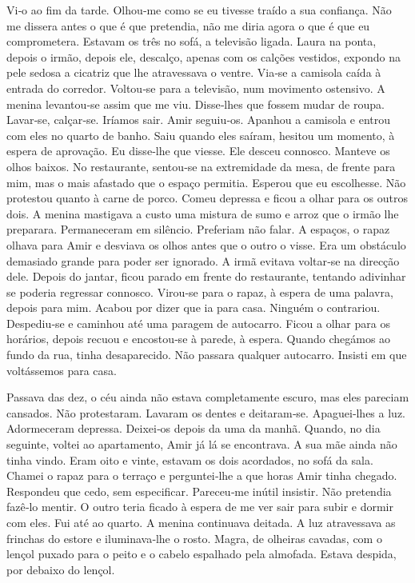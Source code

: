 Vi­‑o ao fim da tarde. Olhou­‑me como se eu tivesse traído a sua
confiança. Não me dissera antes o que é que pretendia, não me diria
agora o que é que eu comprometera. Estavam os três no sofá, a televisão
ligada. Laura na ponta, depois o irmão, depois ele, descalço, apenas com
os calções vestidos, expondo na pele sedosa a cicatriz que lhe
atravessava o ventre. Via­‑se a camisola caída à entrada do corredor.
Voltou­‑se para a televisão, num movimento ostensivo. A menina
levantou­‑se assim que me viu. Disse­‑lhes que fossem mudar de roupa.
Lavar­‑se, calçar­‑se. Iríamos sair. Amir seguiu­‑os. Apanhou a camisola
e entrou com eles no quarto de banho. Saiu quando eles saíram, hesitou
um momento, à espera de aprovação. Eu disse­‑lhe que viesse. Ele desceu
connosco. Manteve os olhos baixos. No restaurante, sentou­‑se na
extremidade da mesa, de frente para mim, mas o mais afastado que o
espaço permitia. Esperou que eu escolhesse. Não protestou quanto à carne
de porco. Comeu depressa e ficou a olhar para os outros dois. A menina
mastigava a custo uma mistura de sumo e arroz que o irmão lhe preparara.
Permaneceram em silêncio. Preferiam não falar. A espaços, o rapaz olhava
para Amir e desviava os olhos antes que o outro o visse. Era um
obstáculo demasiado grande para poder ser ignorado. A irmã evitava
voltar­‑se na direcção dele. Depois do jantar, ficou parado em frente do
restaurante, tentando adivinhar se poderia regressar connosco. Virou­‑se
para o rapaz, à espera de uma palavra, depois para mim. Acabou por dizer
que ia para casa. Ninguém o contrariou. Despediu­‑se e caminhou até uma
paragem de autocarro. Ficou a olhar para os horários, depois recuou e
encostou­‑se à parede, à espera. Quando chegámos ao fundo da rua, tinha
desaparecido. Não passara qualquer autocarro. Insisti em que voltássemos
para casa.

Passava das dez, o céu ainda não estava completamente escuro, mas eles
pareciam cansados. Não protestaram. Lavaram os dentes e deitaram­‑se.
Apaguei­‑lhes a luz. Adormeceram depressa. Deixei­‑os depois da uma da
manhã. Quando, no dia seguinte, voltei ao apartamento, Amir já lá se
encontrava. A sua mãe ainda não tinha vindo. Eram oito e vinte, estavam
os dois acordados, no sofá da sala. Chamei o rapaz para o terraço e
perguntei­‑lhe a que horas Amir tinha chegado. Respondeu que cedo, sem
especificar. Pareceu­‑me inútil insistir. Não pretendia fazê­‑lo mentir.
O outro teria ficado à espera de me ver sair para subir e dormir com
eles. Fui até ao quarto. A menina continuava deitada. A luz atravessava
as frinchas do estore e iluminava­‑lhe o rosto. Magra, de olheiras
cavadas, com o lençol puxado para o peito e o cabelo espalhado pela
almofada. Estava despida, por debaixo do lençol.

